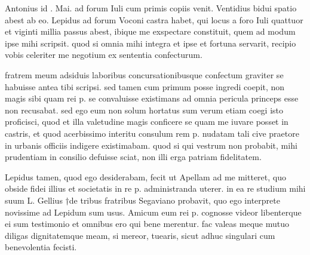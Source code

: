


 Antonius id . Mai. ad forum Iuli cum primis copiis venit. Ventidius bidui spatio abest ab eo. Lepidus ad forum Voconi castra habet, qui locus a foro Iuli quattuor et viginti millia passus abest, ibique me exspectare constituit, quem ad modum ipse mihi scripsit. quod si omnia mihi integra et ipse et fortuna servarit, recipio vobis celeriter me negotium ex sententia confecturum.

 fratrem meum adsiduis laboribus concursationibusque confectum graviter se habuisse antea tibi scripsi. sed tamen cum primum posse ingredi coepit, non magis sibi quam rei p. se convaluisse existimans ad omnia pericula princeps esse non recusabat. sed ego eum non solum hortatus sum verum etiam coegi isto proficisci, quod et illa valetudine magis conficere se quam me iuvare posset in castris, et quod acerbissimo interitu consulum rem p. nudatam tali cive praetore in urbanis officiis indigere existimabam. quod si qui vestrum non probabit, mihi prudentiam in consilio defuisse sciat, non illi erga patriam fidelitatem.

 Lepidus tamen, quod ego desiderabam, fecit ut Apellam ad me mitteret, quo obside fidei illius et societatis in re p. administranda uterer. in ea re studium mihi suum L. Gellius †de tribus fratribus Segaviano probavit, quo ego interprete novissime ad Lepidum sum usus. Amicum eum rei p. cognosse videor libenterque ei sum testimonio et omnibus ero qui bene merentur. fac valeas meque mutuo diligas dignitatemque meam, si mereor, tuearis, sicut adhuc singulari cum benevolentia fecisti.
